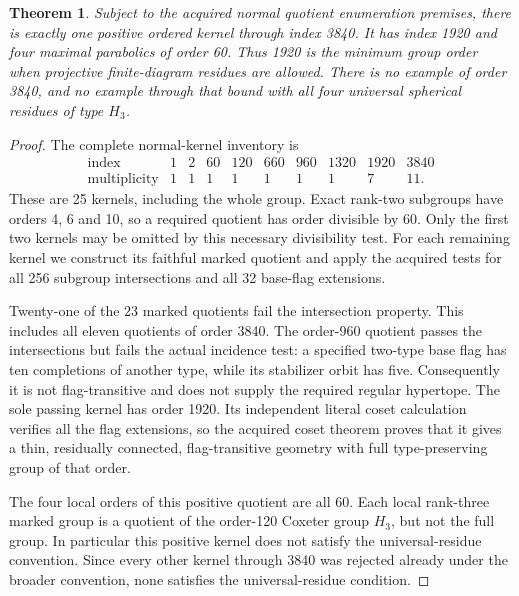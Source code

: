 \documentclass[11pt]{article}
\newtheorem{theorem}{Theorem}
\begin{document}
\begin{theorem}
Subject to the acquired normal quotient enumeration premises, there is
exactly one positive ordered kernel through index 3840. It has index
1920 and four maximal parabolics of order 60. Thus 1920 is the minimum
group order when projective finite-diagram residues are allowed. There
is no example of order 3840, and no example through that bound with all
four universal spherical residues of type $H_3$.
\end{theorem}
\begin{proof}
The complete normal-kernel inventory is
\[
\begin{array}{c|rrrrrrrrr}
\text{index}&1&2&60&120&660&960&1320&1920&3840\\
\text{multiplicity}&1&1&1&1&1&1&1&7&11.
\end{array}
\]
These are 25 kernels, including the whole group. Exact rank-two
subgroups have orders 4, 6 and 10, so a required quotient has order
divisible by 60. Only the first two kernels may be omitted by this
necessary divisibility test. For each remaining kernel we construct its
faithful marked quotient and apply the acquired tests for all 256
subgroup intersections and all 32 base-flag extensions.

Twenty-one of the 23 marked quotients fail the intersection property.
This includes all eleven quotients of order 3840. The order-960 quotient
passes the intersections but fails the actual incidence test: a specified
two-type base flag has ten completions of another type, while its
stabilizer orbit has five. Consequently it is not flag-transitive and
does not supply the required regular hypertope. The sole passing kernel
has order 1920. Its independent literal coset calculation verifies all
the flag extensions, so the acquired coset theorem proves that it gives
a thin, residually connected, flag-transitive geometry with full
type-preserving group of that order.

The four local orders of this positive quotient are all 60. Each local
rank-three marked group is a quotient of the order-120 Coxeter group
$H_3$, but not the full group. In particular this positive kernel does
not satisfy the universal-residue convention. Since every other kernel
through 3840 was rejected already under the broader convention, none
satisfies the universal-residue condition.
\end{proof}

\newpage
\end{document}
